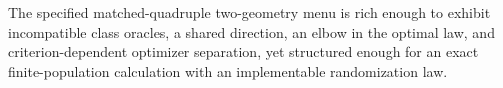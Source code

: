 The specified matched-quadruple two-geometry menu is rich enough to exhibit incompatible class oracles, a shared direction, an elbow in the optimal law, and criterion-dependent optimizer separation, yet structured enough for an exact finite-population calculation with an implementable randomization law.